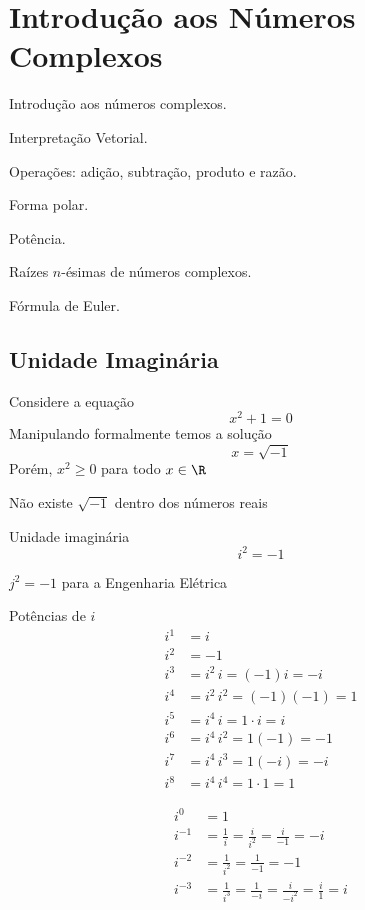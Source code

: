 \chapter{Introdução aos Números Complexos}

Introdução aos números complexos.

Interpretação Vetorial.

Operações: adição, subtração, produto e razão.

Forma polar.

Potência.

Raízes $n$-ésimas de números complexos.

Fórmula de Euler.


\section{Unidade Imaginária}

Considere a equação
\[ x^2 + 1 = 0 \]
Manipulando formalmente temos a solução
\[ x = \sqrt{-1} \]
Porém, \(x^2 \geq 0\) para todo $x\in\R$

Não existe \(\sqrt{-1}\) dentro dos números reais

Unidade imaginária
\[ i^2 = -1 \]

\(j^2=-1\) para a Engenharia Elétrica

Potências de $i$
\begin{align*}
  i^1 & = i  \\
  i^2 & = -1 \\
  i^3 & = i^2 \, i = (-1) i = -i \\
  i^4 & = i^2 \, i^2 = (-1)(-1) = 1  \\
  i^5 & = i^4 \, i = 1\cdot i = i \\
  i^6 & = i^4 \, i^2 = 1(-1) = -1    \\
  i^7 & = i^4 \, i^3 = 1(-i) = -i    \\
  i^8 & = i^4 \, i^4 = 1\cdot 1 = 1
\end{align*}

\begin{align*}
  i^0 & = 1\\
  i^{-1}
  & = \frac{1}{i}
    = \frac{i}{i^2}
    = \frac{i}{-1}
    = -i\\
  i^{-2}
  & = \frac{1}{i^2}
    = \frac{1}{-1}
    = -1\\
  i^{-3}
  & = \frac{1}{i^3}
    = \frac{1}{-i}
    = \frac{i}{-i^2}
    = \frac{i}{1}
    = i
\end{align*}

